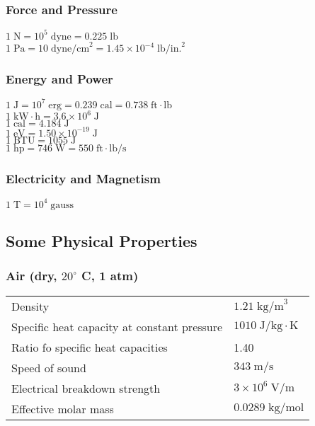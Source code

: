 \documentclass[../PhysicsFormulae.tex]{subfiles}
\begin{document}
\subsubsection{Force and Pressure}
$1 \; \textrm{N} = 10^{5} \; \textrm{dyne} = 0.225 \; \textrm{lb}$\\
$1 \; \textrm{Pa} = 10 \; \textrm{dyne/cm}^2 = 1.45 \times 10^{-4} \; \textrm{lb/in.}^2$

\subsubsection{Energy and Power}
$1 \; \textrm{J} = 10^7 \; \textrm{erg} = 0.239 \; \textrm{cal} = 0.738 \; \textrm{ft} \cdot \textrm{lb}$\\
$1 \; \textrm{kW} \cdot \textrm{h} = 3.6 \times 10^6 \; \textrm{J}$\\
$1 \; \textrm{cal} = 4.184 \; \textrm{J}$\\
$1 \; \textrm{eV} = 1.50 \times 10^{-19} \; \textrm{J}$\\
$1 \; \textrm{BTU} = 1055 \; \textrm{J}$\\
$1 \; \textrm{hp} = 746 \; \textrm{W} = 550 \; \textrm{ft} \cdot \textrm{lb/s}$

\subsubsection{Electricity and Magnetism}
$1 \; \textrm{T} = 10^4 \; \textrm{gauss}$
\thispagestyle{empty}
\subsection{Some Physical Properties}
\subsubsection{Air (dry, $20^{\circ}$ C, 1 atm)}
\begin{tabular}{l l}
    Density & $1.21 \; \textrm{kg/m}^3$\\
    Specific heat capacity at constant pressure & $1010 \; \textrm{J/kg} \cdot \textrm{K}$\\
    Ratio fo specific heat capacities & 1.40\\
    Speed of sound & $343 \; \textrm{m/s}$\\
    Electrical breakdown strength & $3 \times 10^6 \; \textrm{V/m}$\\
    Effective molar mass & $0.0289 \; \textrm{kg/mol}$
\end{tabular}
\end{document}

